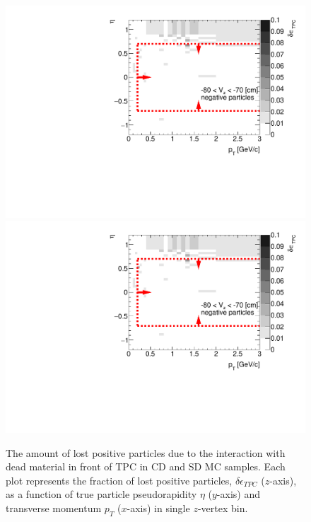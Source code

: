 \begin{figure}[H]
	\caption[The amount of lost positive particles due to the interaction with dead material in front of TPC as a function of $p_T$, $\eta$ and $z$-vertex in CD and SD]{The amount of lost positive particles due to the interaction with dead material in front of TPC in CD and SD MC samples. Each plot represents the fraction of lost positive particles, $\delta\epsilon_{ TPC}$ ($z$-axis), as a function of true particle pseudorapidity $\eta$ ($y$-axis) and transverse momentum $p_{T}$ ($x$-axis) in single $z$-vertex bin.}\label{fig:dead_materialCDSD3Dpositive}
	\parbox{0.325\textwidth}{
		\includegraphics[width=\linewidth,page=17]{graphics/systematicsEfficiency/deadMaterial/secondaries_Unbinned_Charged_SDCD.pdf}\\
		\includegraphics[width=\linewidth,page=20]{graphics/systematicsEfficiency/deadMaterial/secondaries_Unbinned_Charged_SDCD.pdf}\\
}
\end{figure}
